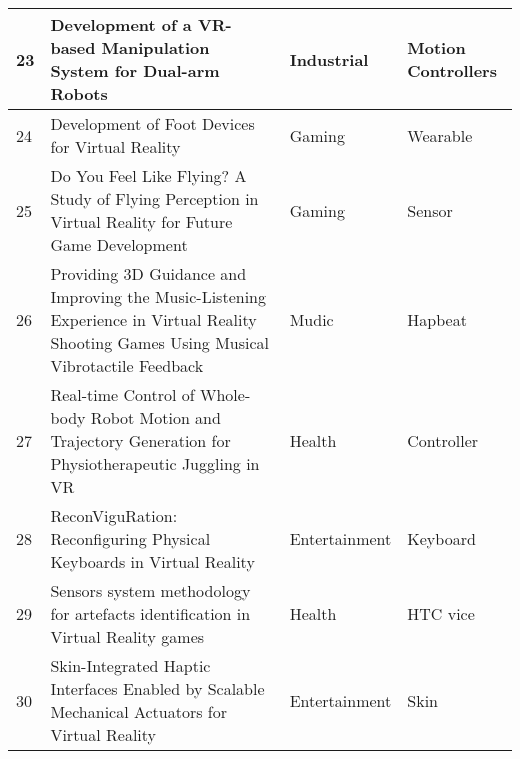 \begin{landscape}
\begin{table}[]
{\begin{tabular}{|l|l|l|l|}
				23                               & Development of a VR-based Manipulation System for Dual-arm Robots                                                                         & Industrial                               & Motion Controllers                                                          \\ \hline
				24                               & Development of Foot Devices for Virtual Reality                                                                                           & Gaming                                   & Wearable                                                                    \\ \hline
				25                               & Do You Feel Like Flying? A Study of Flying Perception in Virtual Reality for Future Game Development                                      & Gaming                                   & Sensor                                                                      \\ \hline
				26                               & Providing 3D Guidance and Improving the Music-Listening Experience in Virtual Reality Shooting Games Using Musical Vibrotactile Feedback  & Mudic                                    & Hapbeat                                                                     \\ \hline
				27                               & Real-time Control of Whole-body Robot Motion and Trajectory Generation for Physiotherapeutic Juggling in VR                               & Health                                   & Controller                                                                  \\ \hline
				28                               & ReconViguRation: Reconfiguring Physical Keyboards in Virtual Reality                                                                      & Entertainment                            & Keyboard                                                                    \\ \hline
				29                               & Sensors system methodology for artefacts identification in Virtual Reality games                                                          & Health                                   & HTC vice                                                                    \\ \hline
				30                               & Skin-Integrated Haptic Interfaces Enabled by Scalable Mechanical Actuators for Virtual Reality                                            & Entertainment                            & Skin                                                                        \\ \hline

\end{tabular}}
\end{table}
\end{landscape}
